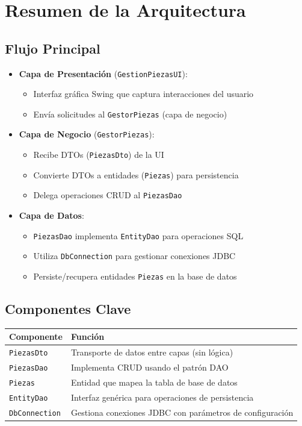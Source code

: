     \section*{Resumen de la Arquitectura}

\subsection*{Flujo Principal}
\begin{itemize}[leftmargin=*]
    \item \textbf{Capa de Presentación} (\texttt{GestionPiezasUI}):
    \begin{itemize}
        \item Interfaz gráfica Swing que captura interacciones del usuario
        \item Envía solicitudes al \texttt{GestorPiezas} (capa de negocio)
    \end{itemize}
    
    \item \textbf{Capa de Negocio} (\texttt{GestorPiezas}):
    \begin{itemize}
        \item Recibe DTOs (\texttt{PiezasDto}) de la UI
        \item Convierte DTOs a entidades (\texttt{Piezas}) para persistencia
        \item Delega operaciones CRUD al \texttt{PiezasDao}
    \end{itemize}
    
    \item \textbf{Capa de Datos}:
    \begin{itemize}
        \item \texttt{PiezasDao} implementa \texttt{EntityDao} para operaciones SQL
        \item Utiliza \texttt{DbConnection} para gestionar conexiones JDBC
        \item Persiste/recupera entidades \texttt{Piezas} en la base de datos
    \end{itemize}
\end{itemize}

\subsection*{Componentes Clave}
\begin{table}[h]
\centering
\begin{tabular}{|l|l|}
\hline
\textbf{Componente} & \textbf{Función} \\ \hline
\texttt{PiezasDto} & Transporte de datos entre capas (sin lógica) \\ \hline
\texttt{PiezasDao} & Implementa CRUD usando el patrón DAO \\ \hline
\texttt{Piezas} & Entidad que mapea la tabla de base de datos \\ \hline
\texttt{EntityDao} & Interfaz genérica para operaciones de persistencia \\ \hline
\texttt{DbConnection} & Gestiona conexiones JDBC con parámetros de configuración \\ \hline
\end{tabular}
\end{table}

